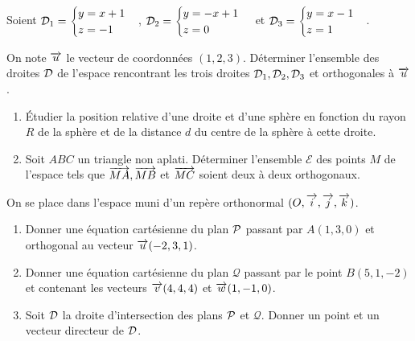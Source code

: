 \begin{exercice}
  Soient \(\Dr_1 =
  \begin{cases}
    y = x + 1 \\
    z = -1
  \end{cases}
  \), 
  \(\Dr_2 =
  \begin{cases}
    y = -x + 1 \\
    z = 0
  \end{cases}
  \) et \(\Dr_3 = 
  \begin{cases} 
    y = x - 1 \\
    z = 1 
  \end{cases}
\). 

  On note \(\vu\) le vecteur de coordonnées \((1, 2, 3)\). Déterminer 
  l'ensemble des droites \(\Dr\) de l'espace rencontrant les trois droites 
  \(\Dr_1, \Dr_2, \Dr_3\) et orthogonales à \(\vu\).
\end{exercice}

\begin{exercice}
  \begin{enumerate}
    \item Étudier la position relative d'une droite et d'une sphère en 
      fonction du rayon \(R\) de la sphère et de la distance \(d\) du centre 
      de la sphère à cette droite.
    \item Soit \(ABC\) un triangle non aplati. Déterminer l'ensemble 
      \(\mathcal{E}\) des points \(M\) de l'espace tels que \(\vect{MA}, 
      \vect{MB}\) et  \(\vect{MC}\) soient deux à deux orthogonaux.
  \end{enumerate}
\end{exercice}

\begin{exercice}
  On se place dans l'espace muni d'un repère orthonormal \((O, \vi, \vj, 
  \vk)\).
  \begin{enumerate}
    \item Donner une équation cartésienne du plan \(\P\) passant par \(A(1, 
      3, 0)\) et orthogonal au vecteur \(\vu(-2, 3, 1)\).
    \item Donner une équation cartésienne du plan \(\mathcal{Q}\) passant 
      par le point \(B(5, 1, -2)\) et contenant les vecteurs \(\vv(4, 4, 
      4)\) et \(\vw(1, -1, 0)\).
    \item Soit \(\Dr\) la droite d'intersection des plans \(\P\) et 
      \(\mathcal{Q}\). Donner un point et un vecteur directeur de \(\Dr\).
  \end{enumerate}
\end{exercice}

